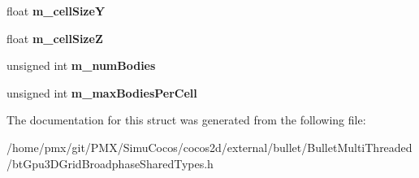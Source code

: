 \begin{DoxyCompactItemize}
\item 
\mbox{\label{structbt3DGridBroadphaseParams_ab48bba603a0cc56d190128d27bcd01a2}} 
float {\bfseries m\+\_\+cell\+SizeY}
\item 
\mbox{\label{structbt3DGridBroadphaseParams_af1a524b2027c4dacbd9d9f5f6afff98e}} 
float {\bfseries m\+\_\+cell\+SizeZ}
\item 
\mbox{\label{structbt3DGridBroadphaseParams_acd87c913a6bff9974e82b0df284229e8}} 
unsigned int {\bfseries m\+\_\+num\+Bodies}
\item 
\mbox{\label{structbt3DGridBroadphaseParams_aa78e26bf160c67798ffb9c73995337d2}} 
unsigned int {\bfseries m\+\_\+max\+Bodies\+Per\+Cell}
\end{DoxyCompactItemize}


The documentation for this struct was generated from the following file\+:\begin{DoxyCompactItemize}
\item 
/home/pmx/git/\+P\+M\+X/\+Simu\+Cocos/cocos2d/external/bullet/\+Bullet\+Multi\+Threaded/bt\+Gpu3\+D\+Grid\+Broadphase\+Shared\+Types.\+h\end{DoxyCompactItemize}
